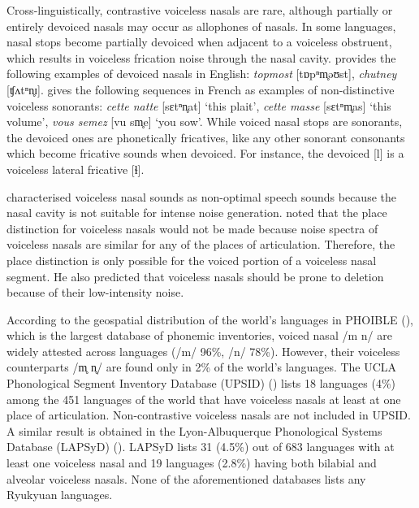 \documentclass[output=paper]{langscibook}
\begin{document}
\sloppy
Cross-linguistically, contrastive voiceless nasals are rare, although partially or entirely devoiced nasals may occur as allophones of nasals. In some languages, nasal stops become partially devoiced when adjacent to a voiceless obstruent, which results in voiceless frication noise through the nasal cavity. \citet{Gimson1980} provides the following examples of devoiced nasals in English: \textit{topmost} [tɒpⁿm̥əʊst], \textit{chutney} [ʧʌtⁿn̥ɪ]. \citet{Dell1973} gives the following sequences in French as examples of non-distinctive voiceless sonorants: \textit{cette natte} [sɛtⁿn̥at] ‘this plait’, \textit{cette masse} [sɛtⁿm̥as] ‘this volume’, \textit{vous semez} [vu sm̥e] ‘you sow’. While voiced nasal stops are sonorants, the devoiced ones are phonetically fricatives, like any other sonorant consonants which become fricative sounds when devoiced. For instance, the devoiced [l] is a voiceless lateral fricative [ɬ].

\citet{OhalaOhala1993} characterised voiceless nasal sounds as non-optimal speech sounds because the nasal cavity is not suitable for intense noise generation. \citet{Ohala1975} noted that the place distinction for voiceless nasals would not be made because noise spectra of voiceless nasals are similar for any of the places of articulation. Therefore, the place distinction is only possible for the voiced portion of a voiceless nasal segment. He also predicted that voiceless nasals should be prone to deletion because of their low-intensity noise.

\fussy\largerpage
According to the geospatial distribution of the world’s languages in PHOIBLE (\citealt{MoranMcCloy2019}), which is the largest database of phonemic inventories, voiced nasal /m n/ are widely attested across languages (/m/ 96\%, /n/ 78\%). However, their voiceless counterparts /m̥ n̥/ are found only in 2\% of the world’s languages. The UCLA Phonological Segment Inventory Database (UPSID) (\citealt{MaddiesonPrecoda1990}) lists 18 languages (4\%) among the 451 languages of the world that have voiceless nasals at least at one place of articulation. Non-contras\-tive voiceless nasals are not included in UPSID. A similar result is obtained in the Lyon-Albuquerque Phonological Systems Database (LAPSyD) (\citealt{MaddiesonEtAl2016}). LAPSyD lists 31 (4.5\%) out of 683 languages with at least one voiceless nasal and 19 languages (2.8\%) having both bilabial and alveolar voiceless nasals. None of the aforementioned databases lists any Ryukyuan languages.
\end{document}
